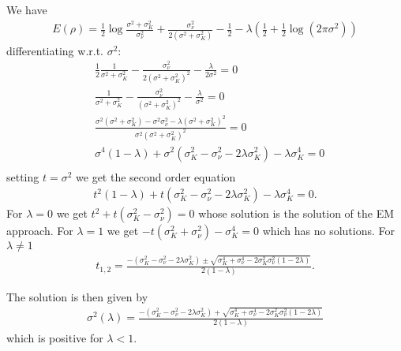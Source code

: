 \documentclass[a4paper]{amsart}
\begin{document}
We have
\begin{align*}
E(\rho) = \frac{1}{2}\log \frac{\sigma^2 + \sigma^2_K}{\sigma^2_{\nu}} + \frac{\sigma^2_{\nu}}{2(\sigma^2 + \sigma^2_K)} - \frac{1}{2} - \lambda \left(\frac{1}{2} + \frac{1}{2}\log(2\pi \sigma^2)\right)
\end{align*}
differentiating w.r.t. $\sigma^2$:
\begin{align*}
&\frac{1}{2} \frac{1}{\sigma^2 + \sigma^2_K} - \frac{\sigma^2_{\nu}}{2(\sigma^2 + \sigma^2_K)^2} - \frac{\lambda }{2\sigma^2} = 0\\
&\frac{1}{\sigma^2 + \sigma^2_K} - \frac{\sigma^2_{\nu}}{(\sigma^2 + \sigma^2_K)^2} - \frac{\lambda }{\sigma^2} = 0\\
& \frac{\sigma^2(\sigma^2 + \sigma^2_K) - \sigma^2\sigma_{\nu}^2 - \lambda(\sigma^2 + \sigma^2_K)^2}{\sigma^2(\sigma^2 + \sigma^2_K)^2} = 0\\
& \sigma^4(1 - \lambda) + \sigma^2(\sigma_K^2 - \sigma_{\nu}^2 - 2\lambda\sigma_K^2) - \lambda\sigma_K^4 = 0\\
\end{align*}
setting $t= \sigma^2$ we get the second order equation
\begin{align*}
t^2(1 - \lambda) + t(\sigma_K^2 - \sigma_{\nu}^2 - 2\lambda\sigma_K^2) - \lambda\sigma_K^4 = 0.
\end{align*}
For $\lambda = 0$ we get $t^2 + t(\sigma_K^2 - \sigma_{\nu}^2)= 0$ whose solution is the solution of the EM approach. For $\lambda = 1$ we get $ -t(\sigma_K^2 + \sigma_{\nu}^2) - \sigma_K^4 = 0$ which has no solutions. For $\lambda \neq 1$
\begin{align*}
t_{1, 2} = \frac{-(\sigma_K^2 - \sigma_{\nu}^2 - 2\lambda\sigma_K^2) \pm \sqrt{\sigma_K^4 + \sigma_{\nu}^4 - 2\sigma_K^2\sigma_{\nu}^2(1 - 2\lambda)}}{2(1 - \lambda)}.
\end{align*}

The solution is then given by
\begin{align*}
\sigma^2(\lambda) = \frac{-(\sigma_K^2 - \sigma_{\nu}^2 - 2\lambda\sigma_K^2) + \sqrt{\sigma_K^4 + \sigma_{\nu}^4 - 2\sigma_K^2\sigma_{\nu}^2(1 - 2\lambda)}}{2(1 - \lambda)}
\end{align*}
which is positive for $\lambda<1$.
\end{document}
